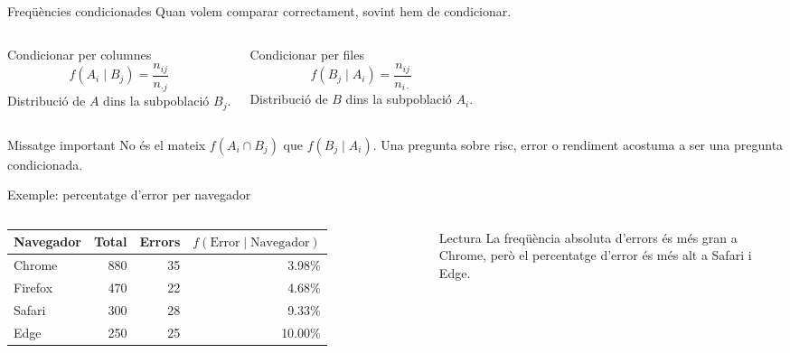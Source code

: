 \documentclass[10pt,aspectratio=169]{beamer}
\begin{document}
\begin{frame}{Freqüències condicionades}
Quan volem comparar correctament, sovint hem de condicionar.
\vspace{0.15cm}
\begin{columns}[T]
\begin{block}{Condicionar per columnes}
\[
 f(A_i\mid B_j)=\frac{n_{ij}}{n_{\cdot j}}
\]
Distribució de $A$ dins la subpoblació $B_j$.
\end{block}
\begin{block}{Condicionar per files}
\[
 f(B_j\mid A_i)=\frac{n_{ij}}{n_{i\cdot}}
\]
Distribució de $B$ dins la subpoblació $A_i$.
\end{block}
\end{columns}
\vspace{0.25cm}
\begin{alertblock}{Missatge important}
No és el mateix $f(A_i\cap B_j)$ que $f(B_j\mid A_i)$. Una pregunta sobre risc, error o rendiment acostuma a ser una pregunta condicionada.
\end{alertblock}
\end{frame}

\begin{frame}{Exemple: percentatge d'error per navegador}
\begin{columns}[T]
\small
\begin{tabular}{lrrr}
\toprule
Navegador & Total & Errors & $f(\text{Error}\mid\text{Navegador})$ \\
\midrule
Chrome  & 880 & 35 & 3.98\% \\
Firefox & 470 & 22 & 4.68\% \\
Safari  & 300 & 28 & 9.33\% \\
Edge    & 250 & 25 & 10.00\% \\
\bottomrule
\end{tabular}
\vspace{0.35cm}
\begin{block}{Lectura}
La freqüència absoluta d'errors és més gran a Chrome, però el percentatge d'error és més alt a Safari i Edge.
\end{block}
\centering
{}
\end{columns}
\end{frame}
\end{document}
